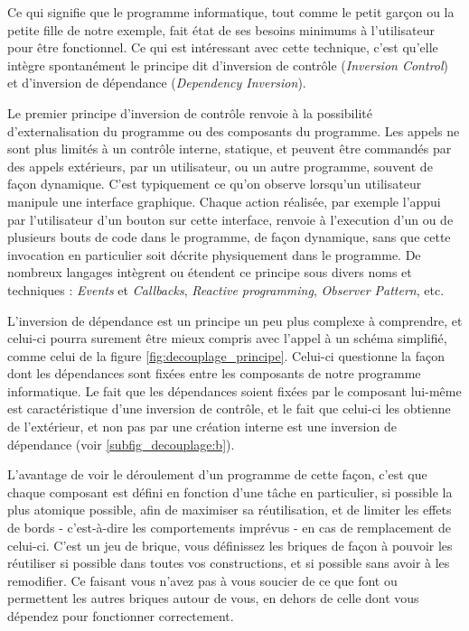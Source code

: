 Ce qui signifie que le programme informatique, tout comme le petit garçon ou la petite fille de notre exemple, fait état de ses besoins minimums à l'utilisateur pour être fonctionnel. Ce qui est intéressant avec cette technique, c'est qu'elle intègre spontanément le principe dit d'inversion de contrôle (\textit{Inversion Control}) et d'inversion de dépendance (\textit{Dependency Inversion}).

Le premier principe d'inversion de contrôle renvoie à la possibilité d'externalisation du programme ou des composants du programme. Les appels ne sont plus limités à un contrôle interne, statique, et peuvent être commandés par des appels extérieurs, par un utilisateur, ou un autre programme, souvent de façon dynamique. C'est typiquement ce qu'on observe lorsqu'un utilisateur manipule une interface graphique. Chaque action réalisée, par exemple l'appui par l'utilisateur d'un bouton sur cette interface, renvoie à l'execution d'un ou de plusieurs bouts de code dans le programme, de façon dynamique, sans que cette invocation en particulier soit décrite physiquement dans le programme. De nombreux langages intègrent ou étendent ce principe sous divers noms et techniques : \textit{Events} et \textit{Callbacks}, \textit{Reactive programming}, \textit{Observer Pattern}, etc.

L'inversion de dépendance est un principe un peu plus complexe à comprendre, et celui-ci pourra surement être mieux compris avec l'appel à un schéma simplifié, comme celui de la figure \ref{fig:decouplage_principe}. Celui-ci questionne la façon dont les dépendances sont fixées entre les composants de notre programme informatique. Le fait que les dépendances soient fixées par le composant lui-même est caractéristique d'une inversion de contrôle, et le fait que celui-ci les obtienne de l'extérieur, et non pas par une création interne est une inversion de dépendance (voir \ref{subfig_decouplage:b}).

L'avantage de voir le déroulement d'un programme de cette façon, c'est que chaque composant est défini en fonction d'une tâche en particulier, si possible la plus atomique possible, afin de maximiser sa réutilisation, et de limiter les effets de bords - c'est-à-dire les comportements imprévus - en cas de remplacement de celui-ci. C'est un jeu de brique, vous définissez les briques de façon à pouvoir les réutiliser si possible dans toutes vos constructions, et si possible sans avoir à les remodifier. Ce faisant vous n'avez pas à vous soucier de ce que font ou permettent les autres briques autour de vous, en dehors de celle dont vous dépendez pour fonctionner correctement.


